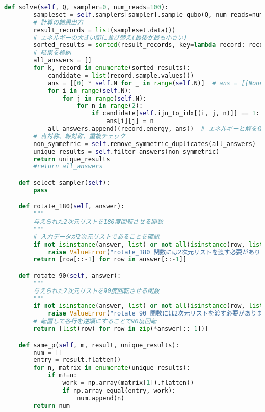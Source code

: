 \documentclass[uplatex,dvipdfmx,a4paper,11pt,oneside,openany]{jsbook}
\begin{document}
\begin{lstlisting}[language=Python]
    def solve(self, Q, sampler=0, num_reads=100):
        sampleset = self.samplers[sampler].sample_qubo(Q, num_reads=num_reads)
        # 計算の結果出力
        result_records = list(sampleset.data())
        # エネルギーの大きい順に並び替え(最後が最も小さい)
        sorted_results = sorted(result_records, key=lambda record: record.energy, reverse=True)
        # 結果を格納
        all_answers = []
        for k, record in enumerate(sorted_results):
            candidate = list(record.sample.values())
            ans = [[0] * self.N for _ in range(self.N)]  # ans = [[None] * N for _ in range(N)]
            for i in range(self.N):
                for j in range(self.N):
                    for n in range(2):
                        if candidate[self.ijn_to_idx[(i, j, n)]] == 1:
                            ans[i][j] = n
            all_answers.append((record.energy, ans))  # エネルギーと解を保存
        # 点対称、線対称、重複チェック
        non_symmetric = self.remove_symmetric_duplicates(all_answers)
        unique_results = self.filter_answers(non_symmetric)
        return unique_results
        #return all_answers

    def select_sampler(self):
        pass

    def rotate_180(self, answer):
        """
        与えられた2次元リストを180度回転させる関数
        """
        # 入力データが2次元リストであることを確認
        if not isinstance(answer, list) or not all(isinstance(row, list) for row in answer):
            raise ValueError("rotate_180 関数には2次元リストを渡す必要があります。")
        return [row[::-1] for row in answer[::-1]]

    def rotate_90(self, answer):
        """
        与えられた2次元リストを90度回転させる関数
        """
        if not isinstance(answer, list) or not all(isinstance(row, list) for row in answer):
            raise ValueError("rotate_90 関数には2次元リストを渡す必要があります。")
        # 転置して各行を逆順にすることで90度回転
        return [list(row) for row in zip(*answer[::-1])]

    def same_p(self, m, result, unique_results):
        num = []
        entry = result.flatten()
        for n, matrix in enumerate(unique_results):
            if m!=n:
                work = np.array(matrix[1]).flatten()
                if np.array_equal(entry, work):
                    num.append(n)
        return num


\end{lstlisting}
\end{document}

